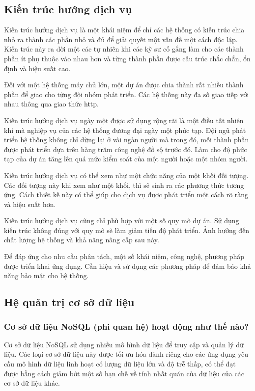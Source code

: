 {{\subsection{Kiến trúc hướng dịch vụ}
Kiến trúc hướng dịch vụ là một khái niệm để chỉ các hệ thống có kiến trúc chia nhỏ ra thành các phần nhỏ và đủ để giải quyết một vấn đề một cách độc lập. Kiến trúc này ra đời một các tự nhiên khi các kỹ sư cố gắng làm cho các thành phần ít phụ thuộc vào nhau hơn và từng thành phần được cấu trúc chắc chắn, ổn định và hiệu suất cao. 

Đối với một hệ thống máy chủ lớn, một dự án được chia thành rất nhiều thành phần để giao cho từng đội nhóm phát triển. Các hệ thống này đa số giao tiếp với nhau thông qua giao thức \acrshort{http}.

Kiến trúc hướng dịch vụ ngày một được sử dụng rộng rãi là một điều tất nhiên khi mà nghiệp vụ của các hệ thống đương đại ngày một phức tạp. Đội ngũ phát triển hệ thống không chỉ dừng lại ở vài ngàn người mà trong đó, mỗi thành phần được phát triển dựa trên hàng trăm công nghệ đồ sộ trước đó. Làm cho độ phức tạp của dự án tăng lên quá mức kiểm soát của một người hoặc một nhóm người.

Kiến trúc hướng dịch vụ có thể xem như một chức năng của một khối đối tượng. Các đối tượng này khi xem như một khối, thì sẽ sinh ra các phương thức tương ứng. Cách thiết kế này có thể giúp cho dịch vụ được phát triển một cách rõ ràng và hiệu suất hơn.

Kiến trúc hướng dịch vụ cũng chỉ phù hợp với một số quy mô dự án. Sử dụng kiến trúc không đúng với quy mô sẽ làm giảm tiến độ phát triển. Ảnh hưởng đến chất lượng hệ thống và khả năng nâng cấp sau này.

Để đáp ứng cho nhu cầu phân tách, một số khái niệm, công nghệ, phương pháp được triển khai ứng dụng. Cần hiệu và sử dụng các phương pháp để đảm bảo khả năng bảo mật cho hệ thống.

\subsection{Hệ quản trị cơ sở dữ liệu}
\subsubsection{Cơ sở dữ liệu NoSQL (phi quan hệ) hoạt động như thế nào? \cite{web:nosql}}

Cơ sở dữ liệu NoSQL sử dụng nhiều mô hình dữ liệu để truy cập và quản lý dữ liệu. Các loại cơ sở dữ liệu này được tối ưu hóa dành riêng cho các ứng dụng yêu cầu mô hình dữ liệu linh hoạt có lượng dữ liệu lớn và độ trễ thấp, có thể đạt được bằng cách giảm bớt một số hạn chế về tính nhất quán của dữ liệu của các cơ sở dữ liệu khác.



}}
